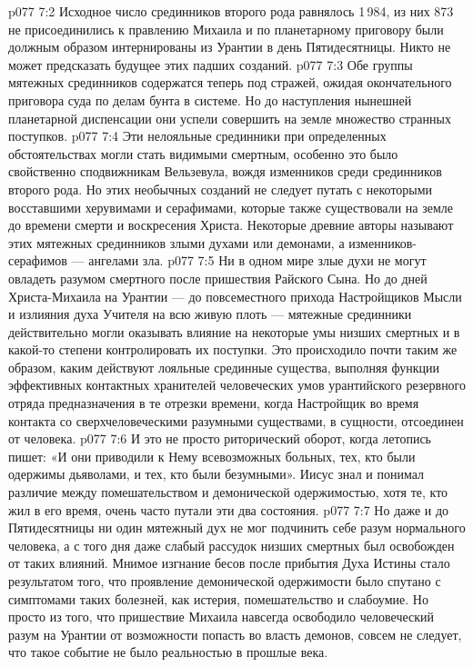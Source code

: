 \vs p077 7:2 Исходное число срединников второго рода равнялось 1\,984, из них 873 не присоединились к правлению Михаила и по планетарному приговору были должным образом интернированы из Урантии в день Пятидесятницы. Никто не может предсказать будущее этих падших созданий.
\vs p077 7:3 Обе группы мятежных срединников содержатся теперь под стражей, ожидая окончательного приговора суда по делам бунта в системе. Но до наступления нынешней планетарной диспенсации они успели совершить на земле множество странных поступков.
\vs p077 7:4 Эти нелояльные срединники при определенных обстоятельствах могли стать видимыми смертным, особенно это было свойственно сподвижникам Вельзевула, вождя изменников среди срединников второго рода. Но этих необычных созданий не следует путать с некоторыми восставшими херувимами и серафимами, которые также существовали на земле до времени смерти и воскресения Христа. Некоторые древние авторы называют этих мятежных срединников злыми духами или демонами, а изменников\hyp{}серафимов --- ангелами зла.
\vs p077 7:5 Ни в одном мире злые духи не могут овладеть разумом смертного после пришествия Райского Сына. Но до дней Христа\hyp{}Михаила на Урантии --- до повсеместного прихода Настройщиков Мысли и излияния духа Учителя на всю живую плоть --- мятежные срединники действительно могли оказывать влияние на некоторые умы низших смертных и в какой\hyp{}то степени контролировать их поступки. Это происходило почти таким же образом, каким действуют лояльные срединные существа, выполняя функции эффективных контактных хранителей человеческих умов урантийского резервного отряда предназначения в те отрезки времени, когда Настройщик во время контакта со сверхчеловеческими разумными существами, в сущности, отсоединен от человека.
\vs p077 7:6 И это не просто риторический оборот, когда летопись пишет: «И они приводили к Нему всевозможных больных, тех, кто были одержимы дьяволами, и тех, кто были безумными». Иисус знал и понимал различие между помешательством и демонической одержимостью, хотя те, кто жил в его время, очень часто путали эти два состояния.
\vs p077 7:7 Но даже и до Пятидесятницы ни один мятежный дух не мог подчинить себе разум нормального человека, а с того дня даже слабый рассудок низших смертных был освобожден от таких влияний. Мнимое изгнание бесов после прибытия Духа Истины стало результатом того, что проявление демонической одержимости было спутано с симптомами таких болезней, как истерия, помешательство и слабоумие. Но просто из того, что пришествие Михаила навсегда освободило человеческий разум на Урантии от возможности попасть во власть демонов, совсем не следует, что такое событие не было реальностью в прошлые века.
